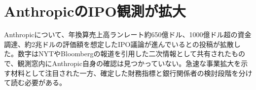 \section{AnthropicのIPO観測が拡大}
Anthropicについて、年換算売上高ランレート約650億ドル、1000億ドル超の資金調達、約2兆ドルの評価額を想定したIPO議論が進んでいるとの投稿が拡散した。数字はNYTやBloombergの報道を引用した二次情報として共有されたもので、観測窓内にAnthropic自身の確認は見つかっていない。急速な事業拡大を示す材料として注目された一方、確定した財務指標と銀行関係者の検討段階を分けて読む必要がある。
